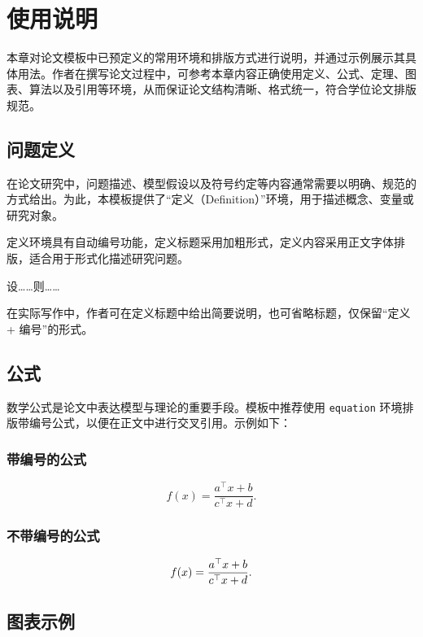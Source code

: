 \chapter{使用说明}

本章对论文模板中已预定义的常用环境和排版方式进行说明，并通过示例展示其具体用法。作者在撰写论文过程中，可参考本章内容正确使用定义、公式、定理、图表、算法以及引用等环境，从而保证论文结构清晰、格式统一，符合学位论文排版规范。

\section{问题定义}

在论文研究中，问题描述、模型假设以及符号约定等内容通常需要以明确、规范的方式给出。为此，本模板提供了“定义（Definition）”环境，用于描述概念、变量或研究对象。

定义环境具有自动编号功能，定义标题采用加粗形式，定义内容采用正文字体排版，适合用于形式化描述研究问题。

\begin{definition}[示例定义]
设……则……
\end{definition}

在实际写作中，作者可在定义标题中给出简要说明，也可省略标题，仅保留“定义 + 编号”的形式。

\section{公式}

数学公式是论文中表达模型与理论的重要手段。模板中推荐使用 \texttt{equation} 环境排版带编号公式，以便在正文中进行交叉引用。示例如下：

\subsection{带编号的公式}

\begin{equation}
  f(x)=\frac{a^\top x + b}{c^\top x + d}.
\end{equation}

\subsection{不带编号的公式}

\begin{equation}
\notag
   f(x)=\frac{a^\top x + b}{c^\top x + d}.
\end{equation}

\section{图表示例}

